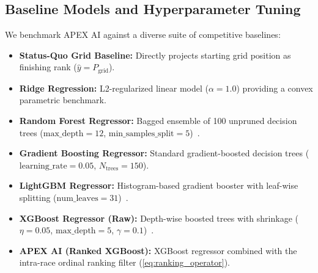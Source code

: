 \documentclass[journal]{IEEEtran}
\begin{document}
\subsection{Baseline Models and Hyperparameter Tuning}
We benchmark APEX AI against a diverse suite of competitive baselines:
\begin{itemize}
    \item \textbf{Status-Quo Grid Baseline:} Directly projects starting grid position as finishing rank ($\hat{y} = P_{\text{grid}}$).
    \item \textbf{Ridge Regression:} L2-regularized linear model ($\alpha = 1.0$) providing a convex parametric benchmark.
    \item \textbf{Random Forest Regressor:} Bagged ensemble of 100 unpruned decision trees ($\text{max\_depth} = 12$, $\text{min\_samples\_split} = 5$)~\cite{breiman2001random}.
    \item \textbf{Gradient Boosting Regressor:} Standard gradient-boosted decision trees ($\text{learning\_rate} = 0.05$, $N_{\text{trees}} = 150$).
    \item \textbf{LightGBM Regressor:} Histogram-based gradient booster with leaf-wise splitting ($\text{num\_leaves} = 31$)~\cite{ke2017lightgbm}.
    \item \textbf{XGBoost Regressor (Raw):} Depth-wise boosted trees with shrinkage ($\eta = 0.05$, $\text{max\_depth} = 5$, $\gamma = 0.1$)~\cite{chen2016xgboost}.
    \item \textbf{APEX AI (Ranked XGBoost):} XGBoost regressor combined with the intra-race ordinal ranking filter (\ref{eq:ranking_operator}).
\end{itemize}
\end{document}
